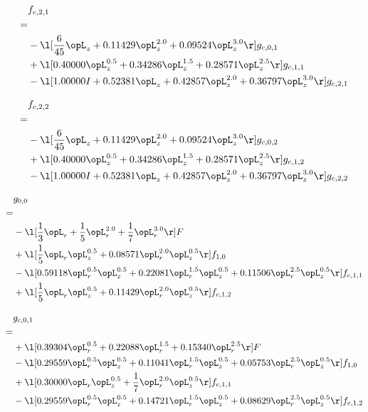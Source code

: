 \begin{alignat}{2} 
\label{eq:f_21_0} 
& f_{c,2,1} \nonumber \\ 
 = \\ 
& - \l[ \frac{6}{45} \opL_z +  0.11429 \opL_z^{2.0} +  0.09524 \opL_z^{3.0}  \r] g_{c,0,1} \nonumber \\ 
& + \l[  0.40000 \opL_z^{0.5} +  0.34286 \opL_z^{1.5} +  0.28571 \opL_z^{2.5}  \r] g_{c,1,1} \nonumber \\ 
& - \l[  1.00000 I +  0.52381 \opL_z +  0.42857 \opL_z^{2.0} +  0.36797 \opL_z^{3.0}  \r] g_{c,2,1} \nonumber \\ 
\end{alignat} 


\begin{alignat}{2} 
\label{eq:f_22_0} 
& f_{c,2,2} \nonumber \\ 
 = \\ 
& - \l[ \frac{6}{45} \opL_z +  0.11429 \opL_z^{2.0} +  0.09524 \opL_z^{3.0}  \r] g_{c,0,2} \nonumber \\ 
& + \l[  0.40000 \opL_z^{0.5} +  0.34286 \opL_z^{1.5} +  0.28571 \opL_z^{2.5}  \r] g_{c,1,2} \nonumber \\ 
& - \l[  1.00000 I +  0.52381 \opL_z +  0.42857 \opL_z^{2.0} +  0.36797 \opL_z^{3.0}  \r] g_{c,2,2} \nonumber \\ 
\end{alignat} 


\begin{alignat}{2} 
\label{eq:g_00_0} 
& g_{0,0} \nonumber \\ 
 = \\ 
& - \l[ \frac{1}{3} \opL_r + \frac{1}{5} \opL_r^{2.0} + \frac{1}{7} \opL_r^{3.0}  \r] F \nonumber \\ 
& + \l[ \frac{1}{5} \opL_r \opL_z^{0.5} +  0.08571 \opL_r^{2.0} \opL_z^{0.5}  \r] f_{1,0} \nonumber \\ 
& - \l[  0.59118 \opL_r^{0.5} \opL_z^{0.5} +  0.22081 \opL_r^{1.5} \opL_z^{0.5} +  0.11506 \opL_r^{2.5} \opL_z^{0.5}  \r] f_{c,1,1} \nonumber \\ 
& + \l[ \frac{1}{5} \opL_r \opL_z^{0.5} +  0.11429 \opL_r^{2.0} \opL_z^{0.5}  \r] f_{c,1,2} \nonumber \\ 
\end{alignat} 


\begin{alignat}{2} 
\label{eq:g_01_0} 
& g_{c,0,1} \nonumber \\ 
 = \\ 
& + \l[  0.39304 \opL_r^{0.5} +  0.22088 \opL_r^{1.5} +  0.15340 \opL_r^{2.5}  \r] F \nonumber \\ 
& - \l[  0.29559 \opL_r^{0.5} \opL_z^{0.5} +  0.11041 \opL_r^{1.5} \opL_z^{0.5} +  0.05753 \opL_r^{2.5} \opL_z^{0.5}  \r] f_{1,0} \nonumber \\ 
& + \l[  0.30000 \opL_r \opL_z^{0.5} + \frac{1}{7} \opL_r^{2.0} \opL_z^{0.5}  \r] f_{c,1,1} \nonumber \\ 
& - \l[  0.29559 \opL_r^{0.5} \opL_z^{0.5} +  0.14721 \opL_r^{1.5} \opL_z^{0.5} +  0.08629 \opL_r^{2.5} \opL_z^{0.5}  \r] f_{c,1,2} \nonumber \\ 
\end{alignat} 


